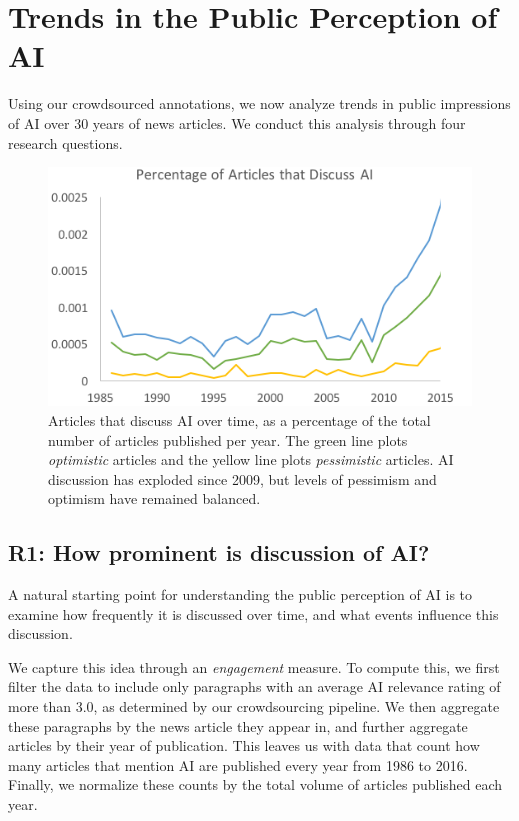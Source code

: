 \documentclass[letterpaper]{article}
\begin{document}
\section{Trends in the Public Perception of AI}

Using our crowdsourced annotations, we now analyze trends in public impressions of AI over 30 years of news articles. We conduct this analysis through four research questions.

\begin{figure}[!t]
\centering
\includegraphics[width=1.0\columnwidth]{ai-over-time2}
\caption{Articles that discuss AI over time, as a percentage of the total number of articles published per year. The green line plots \textit{optimistic} articles and the yellow line plots \textit{pessimistic} articles. AI discussion has exploded since 2009, but levels of pessimism and optimism have remained balanced.}
\label{fig:general}
\end{figure}

\subsection{R1: How prominent is discussion of AI?}

A natural starting point for understanding the public perception of AI is to examine how frequently it is discussed over time, and what events influence this discussion.

We capture this idea through an \textit{engagement} measure. To compute this, we first filter the data to include only paragraphs with an average AI relevance rating of more than 3.0, as determined by our crowdsourcing pipeline. We then aggregate these paragraphs by the news article they appear in, and further aggregate articles by their year of publication. This leaves us with data that count how many articles that mention AI are published every year from 1986 to 2016. Finally, we normalize these counts by the total volume of articles published each year. %
\end{document}
